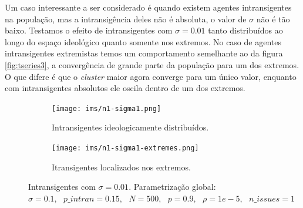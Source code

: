   Um caso interessante a ser considerado é quando existem agentes intransigentes
  na população, mas a intransigência deles não é absoluta, o valor de \(\sigma\) não
  é tão baixo. Testamos o efeito de intransigentes com \(\sigma = 0.01\) tanto
  distribuídos ao longo do espaço ideológico quanto somente nos extremos. No
  caso de agentes intransigentes extremistas temos um comportamento semelhante
  ao da figura \ref{fig:tseries3}, a convergência de grande parte da população
  para um dos extremos. O que difere é que o \textit{cluster} maior agora
  converge para um único valor, enquanto com intransigentes absolutos ele oscila
  dentro de um dos extremos.

    \begin{figure}[H]
    \centering
    \begin{subfigure}[b]{0.49\textwidth}
      \texttt{[image: ims/n1-sigma1.png]}
      \caption{Intransigentes ideologicamente distribuídos.}
    \end{subfigure}
    \begin{subfigure}[b]{0.49\textwidth}
      \texttt{[image: ims/n1-sigma1-extremes.png]}
       \caption{Itransigentes localizados nos extremos.}
     \end{subfigure}

     \caption{ Intransigentes com \(\sigma = 0.01\). Parametrização global: \( \sigma =
       0.1, \text{ } p\_intran = 0.15, \text{ } N = 500, \text{ } p = 0.9,
       \text{ } \rho = 1e-5, \text{ } n\_issues = 1 \)}
    \label{fig:newintrans}
     \end{figure}
  
